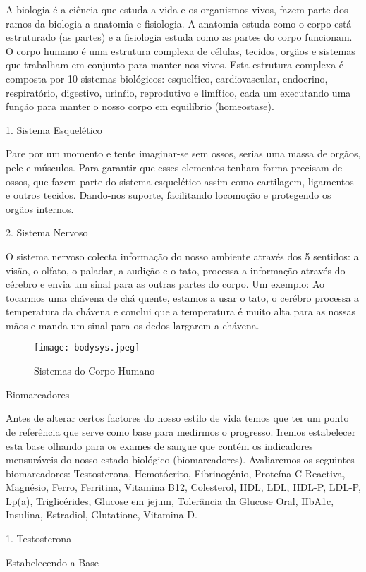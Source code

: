 \documentclass[12pt]{article}
\begin{document}
\justifying
A biologia \'e a ci\^encia que estuda a vida e os organismos vivos, fazem parte
dos ramos da biologia a anatomia e fisiologia. A anatomia estuda como o corpo
est\'a estruturado (as partes) e a fisiologia estuda como as partes do corpo 
funcionam.  O corpo humano \'e uma estrutura complexa de c\'elulas, tecidos, 
org\~aos e sistemas que trabalham em conjunto para manter-nos vivos. 
Esta estrutura complexa \'e composta por 10 sistemas biol\'ogicos: esquel\'tico,
cardiovascular, endocrino, respirat\'orio, digestivo, urin\'rio, reprodutivo e
limf\'tico, cada um executando uma fun\c c\~ao para manter o nosso corpo em
equil\'ibrio (homeostase).

\begin{flushleft}
\Large{1. Sistema Esquel\'etico}
\end{flushleft}
\justifying
\noindent
Pare por um momento e tente imaginar-se sem ossos, serias uma massa de
org\~aos, pele e m\'usculos. Para garantir que esses elementos tenham forma
precisam de ossos, que fazem parte do sistema esquel\'etico assim como
cartilagem,  ligamentos e outros tecidos. Dando-nos suporte, facilitando
locomo\c c\~ao e protegendo os org\~aos internos. 

\begin{flushleft}
\Large{2. Sistema Nervoso}
\end{flushleft}
\justifying
\noindent
O sistema nervoso colecta informa\c c\~ao do nosso ambiente atrav\'es dos 5
sentidos: a vis\~ao, o olfato, o paladar, a audi\c c\~ao e o tato, processa a
informa\c c\~ao atrav\'es do c\'erebro e envia um sinal para as outras partes
do corpo.  Um exemplo: Ao tocarmos uma ch\'avena de ch\'a quente, estamos a
usar o tato, o cer\'ebro processa a temperatura da ch\'avena e conclui que a
temperatura \'e muito alta para as nossas m\~aos e manda um sinal para os dedos
largarem a ch\'avena. 


\begin{figure}[h]
\texttt{[image: bodysys.jpeg]}
\caption{Sistemas do Corpo Humano}
\end{figure}
\pagebreak



\begin{center}
    \Huge{Biomarcadores}
\end{center}
\justifying
Antes de alterar certos factores do nosso estilo de vida temos que 
ter um ponto
de refer\^encia que serve como base para medirmos o progresso. Iremos
estabelecer esta base olhando para os exames de sangue que cont\'em os
indicadores mensur\'aveis do nosso estado biol\'ogico (biomarcadores).
Avaliaremos os seguintes biomarcadores: Testosterona, Hemot\'ocrito,
Fibrinog\'enio, Prote\'ina C-Reactiva, Magn\'esio, Ferro, Ferritina, Vitamina
B12, Colesterol, HDL, LDL, HDL-P, LDL-P, Lp(a), Triglic\'erides, Glucose em
jejum, Toler\^ancia da Glucose Oral, HbA1c, Insulina, Estradiol, Glutatione,
Vitamina D. 



\begin{flushleft}
\Large{1. Testosterona}
\end{flushleft}






\pagebreak

\begin{center}
    \Huge{Estabelecendo a Base}
\end{center}
\end{document}
